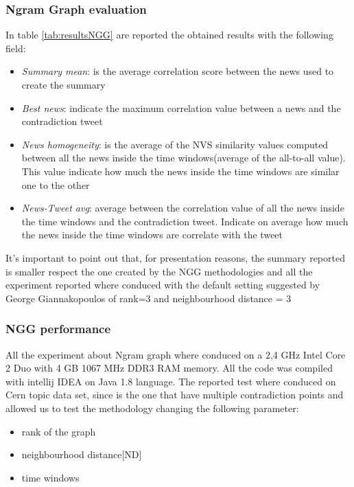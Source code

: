 \subsubsection*{Ngram Graph evaluation}
In table \ref{tab:resultsNGG} are reported the obtained results with the following field:
\begin{itemize}
	\item \emph{Summary mean}: is the average correlation score between the news used to create the summary
	\item \emph{Best news}: indicate the maximum correlation value between a news and the contradiction tweet
	\item \emph{News homogeneity}: is the average of the NVS similarity values computed between all the news inside the time windows(average of the all-to-all value). This value indicate how much the news inside the time windows are similar one to the other
	\item \emph{News-Tweet avg}: average between the correlation value of all the news inside the time windows and the contradiction tweet. Indicate on average how much the news inside the time windows are correlate with the tweet
\end{itemize}
It's important to point out that, for presentation reasons, the summary reported is smaller respect the one created by the NGG methodologies and all the experiment reported where conduced with the default setting suggested by George Giannakopoulos of rank=3 and neighbourhood distance = 3










\subsubsection*{NGG performance}
All the experiment about Ngram graph where conduced on a 2,4 GHz Intel Core 2 Duo with 4 GB 1067 MHz DDR3 RAM memory.
 All the code was compiled with intellij IDEA on Java 1.8 language. 
The reported test where conduced on Cern topic data set, since is the one that have multiple contradiction points and allowed us to test the methodology changing the following parameter:
\begin{itemize}
	\item rank of the graph
	\item neighbourhood distance[ND]
	\item time windows
\end{itemize}



